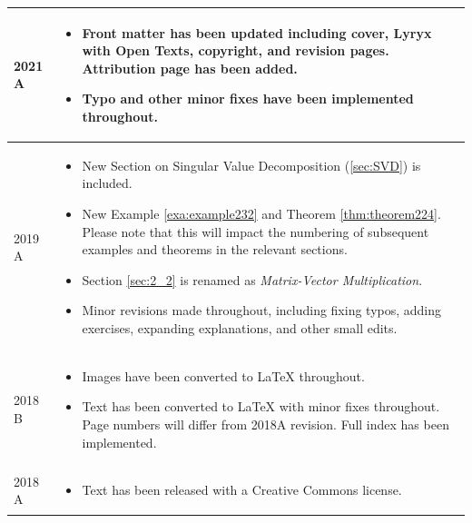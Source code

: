 {\footnotesize


\begin{tabu}{X[-2.5] X[j]} %
\hline
\vspace*{1em}\textcolor{secondarycolour}{2021} \textcolor{secondarycolour}{A} & \begin{itemize}\item Front matter has been updated including cover, Lyryx with Open Texts, copyright, and revision pages. Attribution page has been added. \item Typo and other minor fixes have been implemented throughout. \end{itemize}\\ \hline
\vspace*{1em}2019 A & \begin{itemize}
\item New Section on Singular Value Decomposition (\ref{sec:SVD}) is included.
\item New Example \ref{exa:example232} and Theorem \ref{thm:theorem224}. Please note that this will impact the numbering of subsequent examples and theorems in the relevant sections. 
\item Section \ref{sec:2_2} is renamed as \textit{Matrix-Vector Multiplication}.
\item Minor revisions made throughout, including fixing typos, adding exercises, expanding explanations, and other small edits. 
\end{itemize}\\
\hline
\vspace*{1em}2018 B & \begin{itemize} \item Images have been converted to LaTeX throughout.  \item Text has been converted to LaTeX with minor fixes throughout. Page numbers will differ from 2018A revision. Full index has been implemented. \end{itemize} \\  \hline
\vspace*{1em}2018 A & \begin{itemize} \item Text has been released with a Creative Commons license. \end{itemize} \\  \hline
\end{tabu}
\medskip
}


\setlength{\parskip}{\baselineskip}




